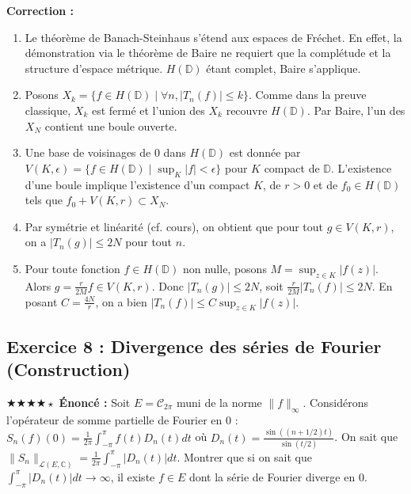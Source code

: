 \documentclass[11pt,a4paper]{article}
\begin{document}
\textbf{Correction :}
\begin{enumerate}
\item Le théorème de Banach-Steinhaus s'étend aux espaces de Fréchet. En effet, la démonstration via le théorème de Baire ne requiert que la complétude et la structure d'espace métrique. $H(\mathbb{D})$ étant complet, Baire s'applique.
\item Posons $X_k = \{ f \in H(\mathbb{D}) \mid \forall n, |T_n(f)| \le k \}$.
   Comme dans la preuve classique, $X_k$ est fermé et l'union des $X_k$ recouvre $H(\mathbb{D})$.
   Par Baire, l'un des $X_N$ contient une boule ouverte.
\item Une base de voisinages de $0$ dans $H(\mathbb{D})$ est donnée par $V(K, \epsilon) = \{f \in H(\mathbb{D}) \mid \sup_K |f| < \epsilon\}$ pour $K$ compact de $\mathbb{D}$.
   L'existence d'une boule implique l'existence d'un compact $K$, de $r > 0$ et de $f_0 \in H(\mathbb{D})$ tels que
   $f_0 + V(K, r) \subset X_N$.
\item Par symétrie et linéarité (cf. cours), on obtient que pour tout $g \in V(K, r)$, on a $|T_n(g)| \le 2N$ pour tout $n$.
\item Pour toute fonction $f \in H(\mathbb{D})$ non nulle, posons $M = \sup_{z \in K} |f(z)|$.
   Alors $g = \frac{r}{2M} f \in V(K, r)$.
   Donc $|T_n(g)| \le 2N$, soit $\frac{r}{2M} |T_n(f)| \le 2N$.
   En posant $C = \frac{4N}{r}$, on a bien $|T_n(f)| \le C \sup_{z \in K} |f(z)|$.
\end{enumerate}
\vspace{1cm}
\subsection*{Exercice 8 : Divergence des séries de Fourier (Construction)}
$\bigstar\bigstar\bigstar\bigstar\star$
\textbf{Énoncé :}
Soit $E = \mathcal{C}_{2\pi}$ muni de la norme $\|f\|_{\infty}$.
Considérons l'opérateur de somme partielle de Fourier en $0$ : $S_n(f)(0) = \frac{1}{2\pi} \int_{-\pi}^{\pi} f(t) D_n(t) dt$ où $D_n(t) = \frac{\sin((n+1/2)t)}{\sin(t/2)}$.
On sait que $\|S_n\|_{\mathcal{L}(E, \mathbb{C})} = \frac{1}{2\pi} \int_{-\pi}^{\pi} |D_n(t)| dt$.
Montrer que si on sait que $\int_{-\pi}^{\pi} |D_n(t)| dt \to \infty$, il existe $f \in E$ dont la série de Fourier diverge en $0$.
\end{document}
